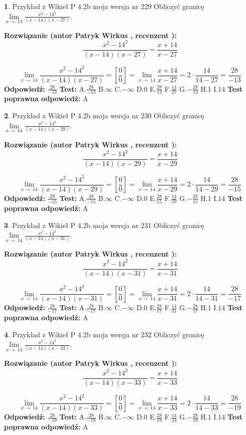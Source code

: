\documentclass[12pt, a4paper]{article}
\theoremstyle{definition} %
\newtheorem{zad}{}
\newcommand{\zadStart}[1]{\begin{zad}#1\newline}
\newcommand{\zadStop}{\end{zad}}
\newcommand{\rozwStart}[2]{\noindent \textbf{Rozwiązanie (autor #1 , recenzent #2): }\newline}
\newcommand{\rozwStop}{\newline}
\newcommand{\odpStart}{\noindent \textbf{Odpowiedź:}\newline}
\newcommand{\odpStop}{\newline}
\newcommand{\testStart}{\noindent \textbf{Test:}\newline}
\newcommand{\testStop}{\newline}
\newcommand{\kluczStart}{\noindent \textbf{Test poprawna odpowiedź:}\newline}
\newcommand{\kluczStop}{\newline}
\begin{document}
\zadStart{Przykład z Wikieł P 4.2b moja wersja nr 229}
Obliczyć granicę $\lim\limits_{x\to\ 14}\frac{x^{2}-14^{2}}{(x-14)(x-27)}$.
\zadStop
\rozwStart{Patryk Wirkus}{}
$$\frac{x^{2}-14^{2}}{(x-14)(x-27)}=\frac{x+14}{x-27}$$

$$\lim\limits_{x\to\ 14}\frac{x^{2}-14^{2}}{(x-14)(x-27)}=[\frac{0}{0}]=\lim\limits_{x\to\ 14}\frac{x+14}{x-27}=2 \cdot \frac{14}{14-27} = \frac{28}{-13}$$
\rozwStop
\odpStart
$\frac{28}{-13}$
\odpStop
\testStart
A.$\frac{28}{-13}$
B.$\infty$
C.$-\infty$
D.$0$
E.$\frac{28}{13}$
F.$\frac{14}{27}$
G.$-\frac{28}{13}$
H.$1$
I.$14$
\testStop
\kluczStart
A
\kluczStop



\zadStart{Przykład z Wikieł P 4.2b moja wersja nr 230}
Obliczyć granicę $\lim\limits_{x\to\ 14}\frac{x^{2}-14^{2}}{(x-14)(x-29)}$.
\zadStop
\rozwStart{Patryk Wirkus}{}
$$\frac{x^{2}-14^{2}}{(x-14)(x-29)}=\frac{x+14}{x-29}$$

$$\lim\limits_{x\to\ 14}\frac{x^{2}-14^{2}}{(x-14)(x-29)}=[\frac{0}{0}]=\lim\limits_{x\to\ 14}\frac{x+14}{x-29}=2 \cdot \frac{14}{14-29} = \frac{28}{-15}$$
\rozwStop
\odpStart
$\frac{28}{-15}$
\odpStop
\testStart
A.$\frac{28}{-15}$
B.$\infty$
C.$-\infty$
D.$0$
E.$\frac{28}{15}$
F.$\frac{14}{29}$
G.$-\frac{28}{15}$
H.$1$
I.$14$
\testStop
\kluczStart
A
\kluczStop



\zadStart{Przykład z Wikieł P 4.2b moja wersja nr 231}
Obliczyć granicę $\lim\limits_{x\to\ 14}\frac{x^{2}-14^{2}}{(x-14)(x-31)}$.
\zadStop
\rozwStart{Patryk Wirkus}{}
$$\frac{x^{2}-14^{2}}{(x-14)(x-31)}=\frac{x+14}{x-31}$$

$$\lim\limits_{x\to\ 14}\frac{x^{2}-14^{2}}{(x-14)(x-31)}=[\frac{0}{0}]=\lim\limits_{x\to\ 14}\frac{x+14}{x-31}=2 \cdot \frac{14}{14-31} = \frac{28}{-17}$$
\rozwStop
\odpStart
$\frac{28}{-17}$
\odpStop
\testStart
A.$\frac{28}{-17}$
B.$\infty$
C.$-\infty$
D.$0$
E.$\frac{28}{17}$
F.$\frac{14}{31}$
G.$-\frac{28}{17}$
H.$1$
I.$14$
\testStop
\kluczStart
A
\kluczStop



\zadStart{Przykład z Wikieł P 4.2b moja wersja nr 232}
Obliczyć granicę $\lim\limits_{x\to\ 14}\frac{x^{2}-14^{2}}{(x-14)(x-33)}$.
\zadStop
\rozwStart{Patryk Wirkus}{}
$$\frac{x^{2}-14^{2}}{(x-14)(x-33)}=\frac{x+14}{x-33}$$

$$\lim\limits_{x\to\ 14}\frac{x^{2}-14^{2}}{(x-14)(x-33)}=[\frac{0}{0}]=\lim\limits_{x\to\ 14}\frac{x+14}{x-33}=2 \cdot \frac{14}{14-33} = \frac{28}{-19}$$
\rozwStop
\odpStart
$\frac{28}{-19}$
\odpStop
\testStart
A.$\frac{28}{-19}$
B.$\infty$
C.$-\infty$
D.$0$
E.$\frac{28}{19}$
F.$\frac{14}{33}$
G.$-\frac{28}{19}$
H.$1$
I.$14$
\testStop
\kluczStart
A
\kluczStop
\end{document}
